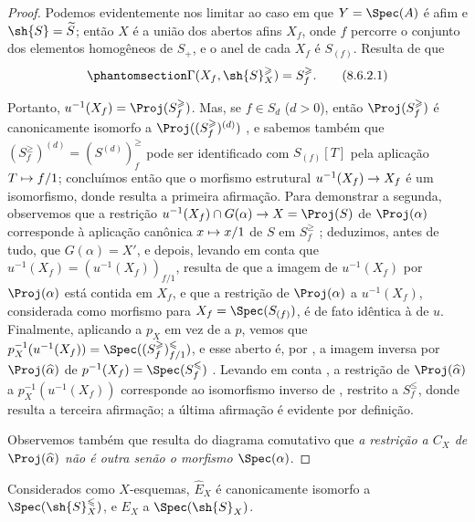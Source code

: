 \documentclass[oneside,10pt]{amsart}
\makeatletter
\renewcommand{\leq}{\leqslant}
\renewcommand{\geq}{\geqslant}
\newcommand{\ega@arrow}[2]{\mathchoice{#1}{#2}{#2}{#2}}
\let\ega@shortmapsto\mapsto
\renewcommand{\to}{\ega@arrow{\longrightarrow}{\rightarrow}}
\renewcommand{\mapsto}{\ega@arrow{\longmapsto}{\ega@shortmapsto}}
\newcommand{\oldpage}[2][]{\marginnote{\normalfont\footnotesize\textbf{#1}~|~#2}\ignorespaces}
\let\EGAOriginalLabel\label
\renewcommand{\label}[1]{\phantomsection\EGAOriginalLabel{#1}}
\newcommand*{\ega@labelnumber}[1]{\StrBehind{#1}{.}}
\newcommand{\eref}[1]{\hyperref[#1]{\normalfont{(\ega@labelnumber{#1})}}}
\makeatother
\begin{document}
\begin{proof}
Podemos evidentemente nos limitar ao caso em que $Y=\Spec(A)$ é afim e $\sh{S}=\widetilde{S}$;
então $X$ é a união dos abertos afins $X_f$, onde $f$ percorre o conjunto dos elementos homogêneos de $S_+$, e o anel de cada $X_f$ é $S_{(f)}$.
Resulta de  que
\[
\label{II.8.6.2.1}
  \Gamma(X_f, \sh{S}_X^\geq) = S_f^\geq.
\tag{8.6.2.1}
\]

Portanto, $u^{-1}(X_f)=\Proj(S_f^\geq)$.
Mas, se $f\in S_d$ ($d>0$), então $\Proj(S_f^\geq)$ é canonicamente isomorfo a $\Proj((S_f^\geq)^{(d)})$ , e sabemos também que $(S_f^\geq)^{(d)}=(S^{(d)})_f^\geq$ pode ser identificado com $S_{(f)}[T]$  pela aplicação $T\mapsto f/1$;
concluímos então  que o morfismo estrutural $u^{-1}(X_f)\to X_f$ é um isomorfismo, donde resulta a primeira afirmação.
Para demonstrar a segunda, observemos que a restrição $u^{-1}(X_f)\cap G(\alpha)\to X=\Proj(S)$ de $\Proj(\alpha)$ corresponde à aplicação canônica $x\mapsto x/1$ de $S$ em $S_f^\geq$ ;
deduzimos, antes de tudo, que $G(\alpha)=X'$, e depois, levando em conta que $u^{-1}(X_f)=(u^{-1}(X_f))_{f/1}$, resulta de  que a imagem de $u^{-1}(X_f)$ por $\Proj(\alpha)$ está contida em $X_f$, e que a restrição de $\Proj(\alpha)$ a $u^{-1}(X_f)$, considerada como morfismo para $X_f=\Spec(S_{(f)})$, é de fato idêntica à de $u$.
Finalmente, aplicando  a $p_X$ em vez de a $p$, vemos que $p_X^{-1}(u^{-1}(X_f)) = \Spec((S_f^\geq)_{f/1}^\leq)$, e esse aberto é, por , a imagem inversa por $\Proj(\widehat{\alpha})$ de $p^{-1}(X_f)=\Spec(S_f^\leq)$ .
Levando em conta , a restrição de $\Proj(\widehat{\alpha})$ a $p_X^{-1}(u^{-1}(X_f))$ corresponde ao isomorfismo inverso de , restrito a $S_f^\leq$, donde resulta a terceira afirmação;
a última afirmação é evidente por definição.

\oldpage[II]{173}
Observemos também que resulta do diagrama comutativo \eref{eq:2.8.5.3.2} que \emph{a restrição a $C_X$ de $\Proj(\widehat{\alpha})$ não é outra senão o morfismo $\Spec(\alpha)$}.
\end{proof}
\begin{corollary}[8.6.3]
\label{II.8.6.3}
Considerados como $X$-esquemas, $\widehat{E}_X$ é canonicamente isomorfo a $\Spec(\sh{S}_X^\leq)$, e $E_X$ a $\Spec(\sh{S}_X)$.
\end{corollary}
\end{document}
